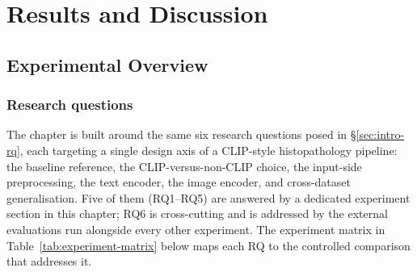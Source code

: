 \chapter{Results and Discussion}\label{chp:results}

%
%

\providecommand{\stale}[1]{{\color{orange}#1\textsuperscript{\dag}}}
\providecommand{\todo}[1]{\textcolor{orange}{\textit{[TODO: #1]}}}
\providecommand{\pending}[1]{\textcolor{blue}{\textit{[pending: #1]}}}

\section{Experimental Overview}
\label{sec:results-overview}

\subsection{Research questions}
\label{sec:results-rqs}

The chapter is built around the same six research questions posed in §\ref{sec:intro-rq}, each targeting a single design axis of a CLIP-style histopathology pipeline: the baseline reference, the CLIP-versus-non-CLIP choice, the input-side preprocessing, the text encoder, the image encoder, and cross-dataset generalisation. Five of them (RQ1--RQ5) are answered by a dedicated experiment section in this chapter; RQ6 is cross-cutting and is addressed by the external evaluations run alongside every other experiment. The experiment matrix in Table~\ref{tab:experiment-matrix} below maps each RQ to the controlled comparison that addresses it.

